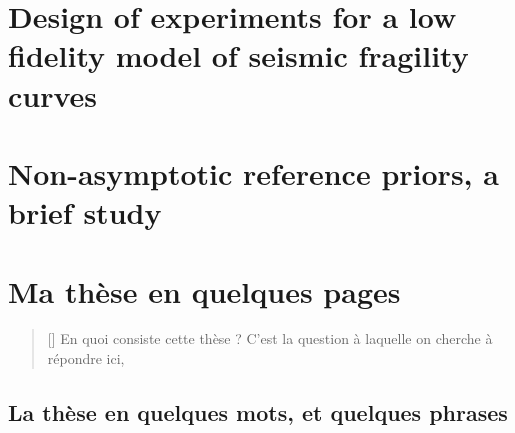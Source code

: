 \documentclass[a4paper]{book}
\begin{document}


\chapter{Design of experiments for a low fidelity model of seismic fragility curves}\label{app:chap:ESAIM}




\chapter{Non-asymptotic reference priors, a brief study}\label{app:chap:nonasympt}







\renewcommand{\thechapter}{\symbolchapt{chapter}}%


\chapter{Ma thèse en quelques pages}

\begin{abstract}[\hspace*{-10pt}]
    En quoi consiste cette thèse ? C'est la question à laquelle on cherche à répondre ici, 
\end{abstract}

\minitoc



\section*{La thèse en quelques mots, et quelques phrases}
\end{document}
